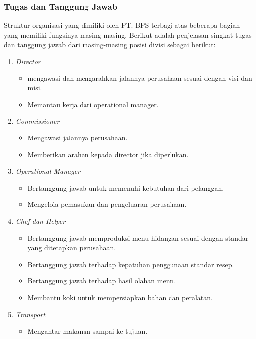 \subsubsection{Tugas dan Tanggung Jawab}
Struktur organisasi yang dimiliki oleh PT. BPS terbagi atas beberapa bagian yang memiliki 
fungsinya masing-masing. 
Berikut adalah penjelasan singkat tugas dan tanggung jawab dari masing-masing posisi divisi sebagai berikut:

\begin{enumerate}
    \item  \emph{Director}
        \begin{itemize}
        \item mengawasi dan mengarahkan jalannya perusahaan sesuai dengan visi dan misi.
        \item Memantau kerja dari operational manager.
        \end{itemize}
    \item \emph{Commissioner} 
        \begin{itemize}
        \item Mengawasi jalannya perusahaan.
        \item Memberikan arahan kepada director jika diperlukan.
        \end{itemize}
    \item \emph{Operational Manager}
        \begin{itemize}
        \item Bertanggung jawab untuk memenuhi kebutuhan dari pelanggan.
        \item Mengelola pemasukan dan pengeluaran perusahaan.
        \end{itemize}
    \item \emph{Chef dan Helper}
        \begin{itemize} 
        \item Bertanggung jawab memproduksi menu hidangan sesuai dengan standar yang ditetapkan perusahaan.
        \item Bertanggung jawab terhadap kepatuhan penggunaan standar resep.
        \item Bertanggung jawab terhadap hasil olahan menu.
        \item Membantu koki untuk mempersiapkan bahan dan peralatan.
        \end{itemize}
    \item \emph{Transport}
        \begin{itemize} 
        \item Mengantar makanan sampai ke tujuan.

\end{itemize}
\end{enumerate}
